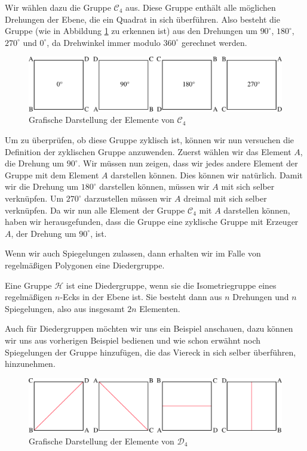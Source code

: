 Wir wählen dazu die Gruppe $\mathcal{C}_4$ aus. Diese Gruppe enthält alle möglichen Drehungen der Ebene, die ein Quadrat in sich überführen. Also besteht die Gruppe (wie in Abbildung \ref{fig:zyklische_gruppe_c4} zu erkennen ist) aus den Drehungen um $90^{\circ}$, $180^{\circ}$, $270^{\circ}$ und $0^{\circ}$, da Drehwinkel immer modulo $360^{\circ}$ gerechnet werden.
\begin{figure}[H]
	\centering
	\includegraphics[width=1\linewidth]{grafiken/zyklische_gruppe_c4}
	\caption{Grafische Darstellung der Elemente von $\mathcal{C}_4$}
	\label{fig:zyklische_gruppe_c4}
\end{figure}
Um zu überprüfen, ob diese Gruppe zyklisch ist, können wir nun versuchen die Definition der zyklischen Gruppe anzuwenden. Zuerst wählen wir das Element $A$, die Drehung um $90^{\circ}$. Wir müssen nun zeigen, dass wir jedes andere Element der Gruppe mit dem Element $A$ darstellen können. Dies können wir natürlich. Damit wir die Drehung um $180^{\circ}$ darstellen können, müssen wir $A$ mit sich selber verknüpfen. Um $270^{\circ}$ darzustellen müssen wir $A$ dreimal mit sich selber verknüpfen. Da wir nun alle Element der Gruppe $\mathcal{C}_4$ mit $A$ darstellen können, haben wir herausgefunden, dass die Gruppe eine zyklische Gruppe mit Erzeuger $A$, der Drehung um $90^{\circ}$, ist. \par\smallskip
Wenn wir auch Spiegelungen zulassen, dann erhalten wir im Falle von regelmäßigen Polygonen eine Diedergruppe.
\begin{defi}[Diedergruppe]
	Eine Gruppe $\mathcal{H}$ ist eine Diedergruppe, wenn sie die Isometriegruppe eines regelmäßigen $n$-Ecks in der Ebene ist. Sie besteht dann aus $n$ Drehungen und $n$ Spiegelungen, also aus insgesamt $2n$ Elementen.
\end{defi}
Auch für Diedergruppen möchten wir uns ein Beispiel anschauen, dazu können wir uns aus vorherigen Beispiel bedienen und wie schon erwähnt noch Spiegelungen der Gruppe hinzufügen, die das Viereck in sich selber überführen, hinzunehmen.
\begin{figure}[H]
	\centering
	\includegraphics[width=1\linewidth]{grafiken/dieder_gruppe}
	\caption{Grafische Darstellung der Elemente von $\mathcal{D}_4$}
	\label{fig:zyklische_gruppe_d4}
\end{figure}
